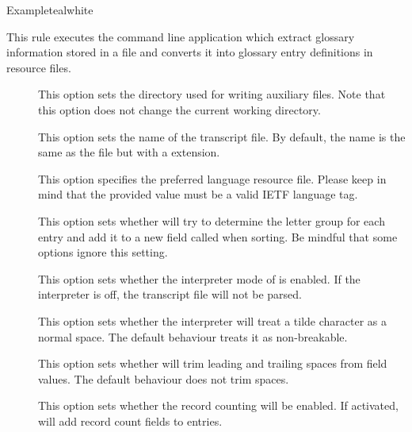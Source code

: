 \begin{description}
\begin{codebox}{Example}{teal}{\icnote}{white}
\end{codebox}

\item[\rulebox{bib2gls}{Nicola Talbot, Paulo Cereda}] This rule executes the  command line application which extract glossary information stored in a  file and converts it into glossary entry definitions in resource files.

\begin{description}
\item[] This option sets the directory used for writing auxiliary files. Note that this option does not change the current working directory.

\item[] This option sets the name of the transcript file. By default, the name is the same as the  file but with a  extension.

\item[] This option specifies the preferred language resource file. Please keep in mind that the provided value must be a valid \gls{IETF} language tag.

\item[] This option sets whether  will try to determine the letter group for each entry and add it to a new field called  when sorting. Be mindful that some  options ignore this setting.

\item[] This option sets whether the interpreter mode of  is enabled. If the interpreter is off, the transcript file will not be parsed.

\item[] This option sets whether the interpreter will treat a tilde character as a normal space. The default behaviour treats it as non-breakable.

\item[] This option sets whether  will trim leading and trailing spaces from field values. The default behaviour does not trim spaces.

\item[] This option sets whether the record counting will be enabled. If activated,  will add record count fields to entries.


\end{description}
\end{description}
